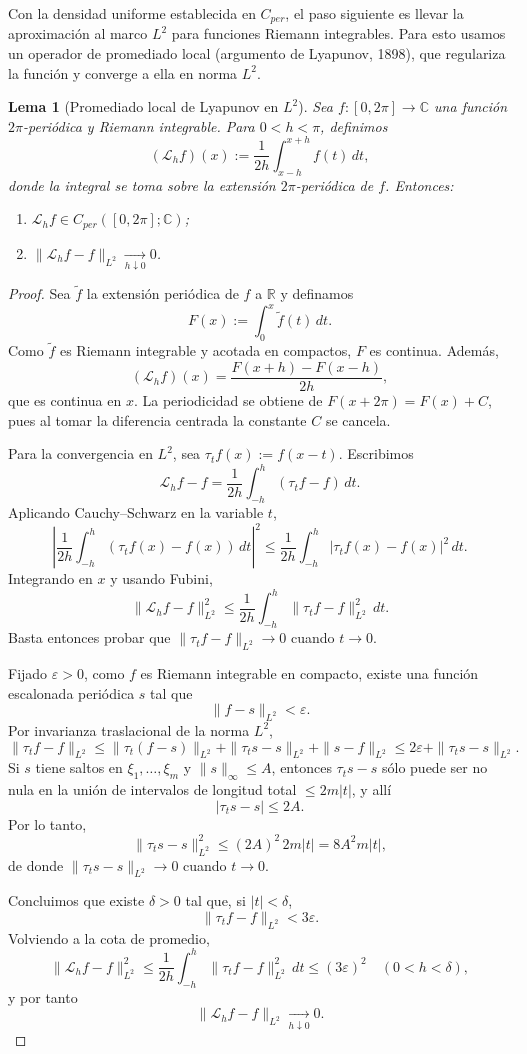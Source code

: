 \documentclass[a4paper,11pt]{report}
\newtheorem{lemma}[theorem]{Lema}
\begin{document}
Con la densidad uniforme establecida en $C_{per}$, el paso siguiente es llevar la aproximaci\'on al marco $L^2$ para funciones Riemann integrables. Para esto usamos un operador de promediado local (argumento de Lyapunov, 1898), que regulariza la función y converge a ella en norma $L^2$.

\begin{lemma}[Promediado local de Lyapunov en $L^2$]\label{lem:lyapunov_promedio_L2}
Sea $f:[0,2\pi]\to\mathbb C$ una función $2\pi$-periódica y Riemann integrable. Para $0<h<\pi$, definimos
\[
(\mathcal L_h f)(x):=\frac1{2h}\int_{x-h}^{x+h} f(t)\,dt,
\]
donde la integral se toma sobre la extensión $2\pi$-periódica de $f$.
Entonces:
\begin{enumerate}
\item $\mathcal L_h f\in C_{per}([0,2\pi];\mathbb C)$;
\item $\|\mathcal L_h f-f\|_{L^2}\xrightarrow[h\downarrow 0]{}0$.
\end{enumerate}
\end{lemma}

\begin{proof}
Sea $\widetilde f$ la extensión periódica de $f$ a $\mathbb R$ y definamos
\[
F(x):=\int_0^x \widetilde f(t)\,dt.
\]
Como $\widetilde f$ es Riemann integrable y acotada en compactos, $F$ es continua. Además,
\[
(\mathcal L_h f)(x)=\frac{F(x+h)-F(x-h)}{2h},
\]
que es continua en $x$. La periodicidad se obtiene de $F(x+2\pi)=F(x)+C$, pues al tomar la diferencia centrada la constante $C$ se cancela.

Para la convergencia en $L^2$, sea $\tau_t f(x):=f(x-t)$. Escribimos
\[
\mathcal L_h f-f=\frac1{2h}\int_{-h}^{h}(\tau_t f-f)\,dt.
\]
Aplicando Cauchy--Schwarz en la variable $t$,
\[
\left|\frac1{2h}\int_{-h}^{h}(\tau_t f(x)-f(x))\,dt\right|^2
\le
\frac1{2h}\int_{-h}^{h}|\tau_t f(x)-f(x)|^2\,dt.
\]
Integrando en $x$ y usando Fubini,
\[
\|\mathcal L_h f-f\|_{L^2}^2
\le
\frac1{2h}\int_{-h}^{h}\|\tau_t f-f\|_{L^2}^2\,dt.
\]
Basta entonces probar que $\|\tau_t f-f\|_{L^2}\to0$ cuando $t\to0$.

Fijado $\varepsilon>0$, como $f$ es Riemann integrable en compacto, existe una función escalonada periódica $s$ tal que
\[
\|f-s\|_{L^2}<\varepsilon.
\]
Por invarianza traslacional de la norma $L^2$,
\[
\|\tau_t f-f\|_{L^2}
\le \|\tau_t(f-s)\|_{L^2}+\|\tau_t s-s\|_{L^2}+\|s-f\|_{L^2}
\le 2\varepsilon+\|\tau_t s-s\|_{L^2}.
\]
Si $s$ tiene saltos en $\xi_1,\dots,\xi_m$ y $\|s\|_\infty\le A$, entonces $\tau_t s-s$ sólo puede ser no nula en la unión de intervalos de longitud total $\le 2m|t|$, y allí
\[
|\tau_t s-s|\le 2A.
\]
Por lo tanto,
\[
\|\tau_t s-s\|_{L^2}^2\le (2A)^2\,2m|t|=8A^2m|t|,
\]
de donde $\|\tau_t s-s\|_{L^2}\to0$ cuando $t\to0$.

Concluimos que existe $\delta>0$ tal que, si $|t|<\delta$,
\[
\|\tau_t f-f\|_{L^2}<3\varepsilon.
\]
Volviendo a la cota de promedio,
\[
\|\mathcal L_h f-f\|_{L^2}^2
\le
\frac1{2h}\int_{-h}^{h}\|\tau_t f-f\|_{L^2}^2\,dt
\le (3\varepsilon)^2
\quad (0<h<\delta),
\]
y por tanto
\[
\|\mathcal L_h f-f\|_{L^2}\xrightarrow[h\downarrow0]{}0.
\]
\end{proof}
\end{document}
